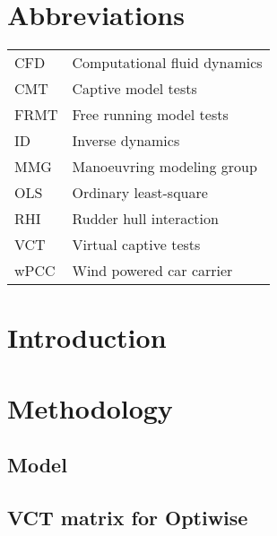 \documentclass[preprint,12pt,authoryear]{elsarticle}
\begin{document}
\section*{Abbreviations}
\label{sec:introduction}
\begin{table}[h]
    \centering
    \scriptsize
    \label{tab:abbreviations}
    \begin{tabular}{l l}

    CFD & Computational fluid dynamics \\
    CMT & Captive model tests \\
    FRMT & Free running model tests \\
    ID & Inverse dynamics \\
    MMG & Manoeuvring modeling group \\
    OLS & Ordinary least-square \\
    RHI & Rudder hull interaction \\
    VCT & Virtual captive tests \\
    wPCC & Wind powered car carrier \\
    \end{tabular}
        
\end{table}
\FloatBarrier

\section{Introduction}
\label{sec:introduction}

\section{Methodology}
\subsection{Model}


%

\subsection{VCT matrix for Optiwise}

\FloatBarrier
\end{document}
